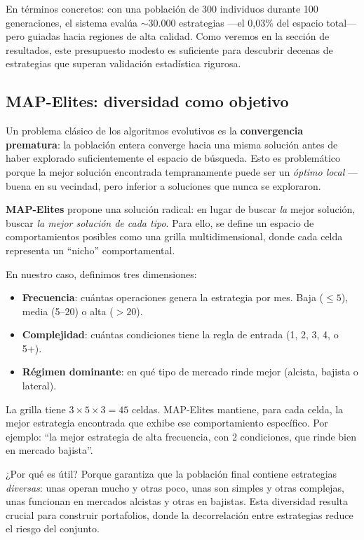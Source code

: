 \documentclass[12pt,a4paper]{article}
\begin{document}
En términos concretos: con una población de 300 individuos durante 100 generaciones,
el sistema evalúa $\sim$30.000 estrategias ---el 0,03\% del espacio total--- pero
guiadas hacia regiones de alta calidad. Como veremos en la sección de resultados,
este presupuesto modesto es suficiente para descubrir decenas de estrategias que
superan validación estadística rigurosa.

\subsection{MAP-Elites: diversidad como objetivo}
\label{sec:mapelites}

Un problema clásico de los algoritmos evolutivos es la \textbf{convergencia prematura}:
la población entera converge hacia una misma solución antes de haber explorado
suficientemente el espacio de búsqueda. Esto es problemático porque la mejor solución
encontrada tempranamente puede ser un \textit{óptimo local} ---buena en su vecindad,
pero inferior a soluciones que nunca se exploraron.

\textbf{MAP-Elites} propone una solución radical: en
lugar de buscar \textit{la} mejor solución, buscar \textit{la mejor solución de cada
tipo}. Para ello, se define un espacio de comportamientos posibles como una grilla
multidimensional, donde cada celda representa un ``nicho'' comportamental.

En nuestro caso, definimos tres dimensiones:
\begin{itemize}
\item \textbf{Frecuencia}: cuántas operaciones genera la estrategia por mes.
  Baja ($\leq 5$), media (5--20) o alta ($> 20$).
\item \textbf{Complejidad}: cuántas condiciones tiene la regla de entrada
  (1, 2, 3, 4, o 5+).
\item \textbf{Régimen dominante}: en qué tipo de mercado rinde mejor
  (alcista, bajista o lateral).
\end{itemize}

La grilla tiene $3 \times 5 \times 3 = 45$ celdas. MAP-Elites mantiene, para cada
celda, la mejor estrategia encontrada que exhibe ese comportamiento específico. Por
ejemplo: ``la mejor estrategia de alta frecuencia, con 2 condiciones, que rinde
bien en mercado bajista''.

¿Por qué es útil? Porque garantiza que la población final contiene estrategias
\textit{diversas}: unas operan mucho y otras poco, unas son simples y otras complejas,
unas funcionan en mercados alcistas y otras en bajistas. Esta diversidad resulta
crucial para construir portafolios, donde la decorrelación entre estrategias reduce
el riesgo del conjunto.
\end{document}
